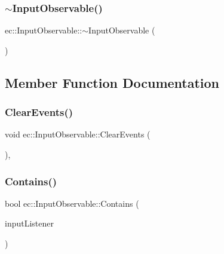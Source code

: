 \subsubsection{\texorpdfstring{$\sim$\+Input\+Observable()}{~InputObservable()}}
{\footnotesize\ttfamily ec\+::\+Input\+Observable\+::$\sim$\+Input\+Observable (\begin{DoxyParamCaption}{ }\end{DoxyParamCaption})\hspace{0.3cm}{\ttfamily [virtual]}}



\subsection{Member Function Documentation}
\mbox{\label{classec_1_1_input_observable_a5af16f48a5bdca46229a6b5bc7769e2d}} 
\subsubsection{\texorpdfstring{Clear\+Events()}{ClearEvents()}}
{\footnotesize\ttfamily void ec\+::\+Input\+Observable\+::\+Clear\+Events (\begin{DoxyParamCaption}{ }\end{DoxyParamCaption})\hspace{0.3cm}{\ttfamily [protected]}, {\ttfamily [virtual]}}

\mbox{\label{classec_1_1_input_observable_a7431f35b81b1a34f40605b10739e3ac1}} 
\subsubsection{\texorpdfstring{Contains()}{Contains()}}
{\footnotesize\ttfamily bool ec\+::\+Input\+Observable\+::\+Contains (\begin{DoxyParamCaption}\item[{\mbox{\hyperlink{classec_1_1_input_listener}{Input\+Listener}} $\ast$}]{input\+Listener }\end{DoxyParamCaption})\hspace{0.3cm}{\ttfamily [virtual]}}

